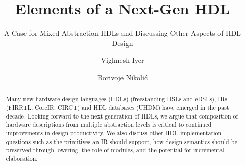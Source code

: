 \documentclass[sigplan,review,nonacm]{acmart}
\begin{document}
\title{Elements of a Next-Gen HDL}
\subtitle{A Case for Mixed-Abstraction HDLs and Discussing Other Aspects of HDL Design}


\author{Vighnesh Iyer}

\author{Borivoje Nikolić}




\begin{abstract}

Many new hardware design languages (HDLs) (freestanding DSLs and eDSLs), IRs (FIRRTL\cite{firrtl}, CoreIR\cite{coreir}, CIRCT\cite{circt}) and HDL databases (UHDM\cite{uhdm}) have emerged in the past decade.
Looking forward to the next generation of HDLs, we argue that composition of hardware descriptions from multiple abstraction levels is critical to continued improvements in design productivity.
We also discuss other HDL implementation questions such as the primitives an IR should support, how design semantics should be preserved through lowering, the role of modules, and the potential for incremental elaboration.
\end{abstract}
\end{document}
